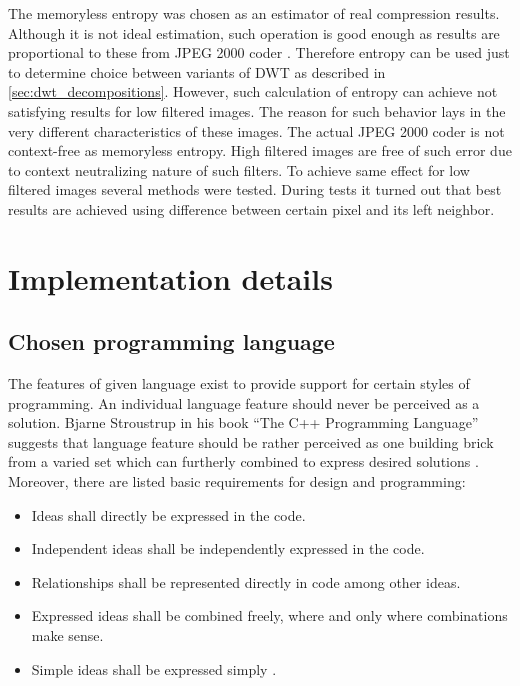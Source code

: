 The memoryless entropy was chosen as an estimator of real compression results. Although it is not ideal estimation,
such operation is good enough as results are proportional to these from JPEG 2000 coder \cite{entropy}.
Therefore entropy can be used just to determine choice between variants of DWT as described in \ref{sec:dwt_decompositions}.
However, such calculation of entropy can achieve not satisfying results for low filtered images.
The reason for such behavior lays in the very different characteristics of these images. The actual JPEG 2000 coder
is not context-free as memoryless entropy. High filtered images are free of such error due to context neutralizing
nature of such filters. To achieve same effect for low filtered images several methods were tested.
During tests it turned out that best results are achieved using difference between certain pixel and its left neighbor.


\section{Implementation details}

\subsection{Chosen programming language}

The features of given language exist to provide support for certain styles of programming. An individual
language feature should never be perceived as a solution. Bjarne Stroustrup in his book ``The C++ Programming Language''
suggests that language feature should be rather perceived as one building brick from a varied set which can
furtherly combined to express desired solutions \cite{cpp_language_bjarne}. Moreover, there are listed
basic requirements for design and programming:
\begin{itemize}
    \item Ideas shall directly be expressed in the code.
    \item Independent ideas shall be independently expressed in the code.
    \item Relationships shall be represented directly in code among other ideas.
    \item Expressed ideas shall be combined freely, where and only where combinations make sense.
    \item Simple ideas shall be expressed simply \cite{cpp_language_bjarne}.
\end{itemize}

